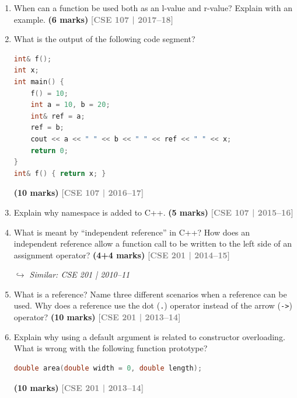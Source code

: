 \documentclass[12pt,a3paper]{article}
\newcommand{\yr}[1]{\hfill\textcolor{gray}{\small\textbf{[#1]}}}
\newcommand{\mk}[1]{\textcolor{orange!70!black}{\small\textbf{(#1 marks)}}}
\newcommand{\variant}[1]{\par\vspace{1pt}\textcolor{blue!50!black}%
  {\footnotesize\textit{$\hookrightarrow$ Similar: #1}}}
\begin{document}
\begin{enumerate}



\item When can a function be used both as an l-value and r-value? Explain with an example. \mk{6}
\yr{CSE 107 | 2017--18}



\item What is the output of the following code segment?
\begin{lstlisting}[language=C++]
int& f();
int x;
int main() {
    f() = 10;
    int a = 10, b = 20;
    int& ref = a;
    ref = b;
    cout << a << " " << b << " " << ref << " " << x;
    return 0;
}
int& f() { return x; }
\end{lstlisting}
\mk{10}
\yr{CSE 107 | 2016--17}






\item Explain why namespace is added to C++. \mk{5}
\yr{CSE 107 | 2015--16}




\item What is meant by ``independent reference'' in C++? How does an independent reference allow a function call to be written to the left side of an assignment operator? \mk{4+4}
\yr{CSE 201 | 2014--15}
\variant{CSE 201 | 2010--11}




\item What is a reference? Name three different scenarios when a reference can be used. Why does a reference use the dot (\texttt{.}) operator instead of the arrow (\texttt{->}) operator? \mk{10}
\yr{CSE 201 | 2013--14}






\item Explain why using a default argument is related to constructor overloading. What is wrong with the following function prototype?
\begin{lstlisting}[language=C++]
double area(double width = 0, double length);
\end{lstlisting}
\mk{10}
\yr{CSE 201 | 2013--14}


\end{enumerate}
\end{document}
